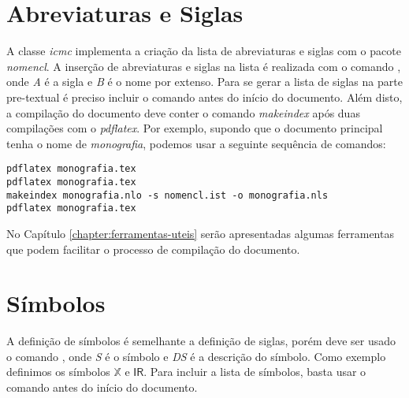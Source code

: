 \section{Abreviaturas e Siglas}

A classe \textit{icmc} implementa a criação da lista de abreviaturas e siglas com o pacote \textit{nomencl}. A inserção de abreviaturas e siglas na lista é realizada com o comando , onde \textit{A} é a sigla e \textit{B} é o nome por extenso. Para se gerar a lista de siglas na parte pre-textual é preciso incluir o comando  antes do início do documento. Além disto, a compilação do documento deve conter o comando \textit{makeindex} após duas compilações com o \textit{pdflatex}. Por exemplo, supondo que o documento principal tenha o nome de \textit{monografia}, podemos usar a seguinte sequência de comandos:
\begin{verbatim}
pdflatex monografia.tex
pdflatex monografia.tex
makeindex monografia.nlo -s nomencl.ist -o monografia.nls
pdflatex monografia.tex
\end{verbatim}

No Capítulo \ref{chapter:ferramentas-uteis} serão apresentadas algumas ferramentas que podem facilitar o processo de compilação do documento.

\section{Símbolos}

A definição de símbolos é semelhante a definição de siglas, porém deve ser usado o comando , onde \textit{S} é o símbolo e \textit{DS} é a descrição do símbolo. Como exemplo definimos os símbolos $\mathbb{X}$ e ${\mathsf{I\!R}}$. Para incluir a lista de símbolos, basta usar o comando  antes do início do documento.

